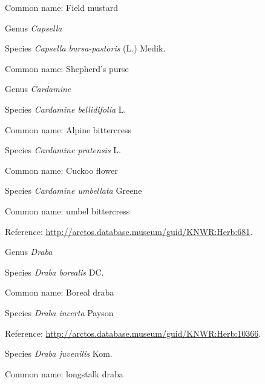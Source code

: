\documentclass[9pt, article]{memoir}
\begin{document}
\begin{multicols}{2}
Common name: Field mustard

\vspace{6pt}\noindent\hspace{30pt}Genus \textit{Capsella}


\vspace{6pt}\noindent\hspace{36pt}Species \textit{Capsella bursa-pastoris} (L.) Medik.


Common name: Shepherd's purse

\vspace{6pt}\noindent\hspace{30pt}Genus \textit{Cardamine}


\vspace{6pt}\noindent\hspace{36pt}Species \textit{Cardamine bellidifolia} L.


Common name: Alpine bittercress

\vspace{6pt}\noindent\hspace{36pt}Species \textit{Cardamine pratensis} L.


Common name: Cuckoo flower

\vspace{6pt}\noindent\hspace{36pt}Species \textit{Cardamine umbellata} Greene


Common name: umbel bittercress

Reference: 
\url{http://arctos.database.museum/guid/KNWR:Herb:681}.

\vspace{6pt}\noindent\hspace{30pt}Genus \textit{Draba}


\vspace{6pt}\noindent\hspace{36pt}Species \textit{Draba borealis} DC.


Common name: Boreal draba

\vspace{6pt}\noindent\hspace{36pt}Species \textit{Draba incerta} Payson


Reference: 
\url{http://arctos.database.museum/guid/KNWR:Herb:10366}.

\vspace{6pt}\noindent\hspace{36pt}Species \textit{Draba juvenilis} Kom.


Common name: longstalk draba


\end{multicols}
\end{document}
